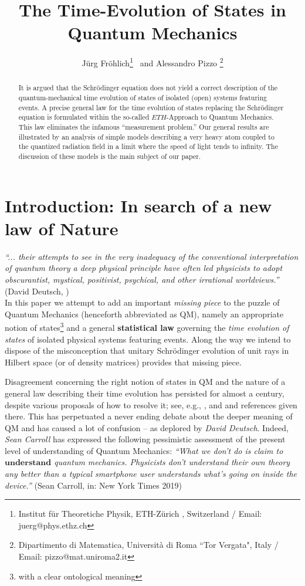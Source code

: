 \documentclass[a4paper,11pt]{article}
\author{J\"{u}rg Fr\"{o}hlich\footnote{Institut f\"ur Theoretiche Physik, ETH-Z\"urich , Switzerland / Email: juerg@phys.ethz.ch}\,\,\, and Alessandro Pizzo \footnote{Dipartimento di Matematica, Universit\`a di Roma ``Tor Vergata", Italy
/ Email: pizzo@mat.uniroma2.it}}
\title{The Time-Evolution of States in Quantum Mechanics}
\begin{document}
\maketitle


\begin{abstract}
It is argued that the Schr\"odinger equation does not yield a correct description of the quantum-mechanical time evolution of states of isolated (open) systems featuring events. A precise general law for the time evolution of states replacing the Schr\"odinger equation is formulated within the so-called $ETH$-Approach to Quantum Mechanics. This law eliminates the infamous ``measurement problem.'' Our general results are illustrated by an analysis of simple models describing a very heavy atom coupled to the quantized radiation field in a limit where the speed of light tends to infinity. The discussion of these models is the main subject of our paper.
\end{abstract}

\tableofcontents

\section{Introduction: In search of a new law of Nature}\label{Intro}

\hspace{0.5cm} \textit{``... their attempts to see in the very inadequacy of the conventional interpretation of quantum theory a 
deep physical principle have often led physicists to adopt obscurantist, mystical, positivist, psychical, and other irrational 
worldviews.''} (David Deutsch, \cite{Deutsch})\\

In this paper we attempt to add an important \textit{missing piece} to the puzzle of Quantum Mechanics (henceforth 
abbreviated as QM), namely an appropriate notion of states\footnote{with a clear ontological meaning} and a general {\bf{statistical law}} governing the \textit{time evolution of states} of isolated physical systems featuring events. Along the way we intend to dispose of the misconception 
that unitary Schr\"odinger evolution of unit rays in Hilbert space (or of density matrices) provides that missing piece.

Disagreement concerning the right notion of states in QM and the nature of a general law describing their time evolution 
has persisted for almost a century, despite various proposals of how to resolve it; see, e.g., \cite{Bohm, GRW, Everett}, 
and \cite{Bell, ABDZ} and references given there. This has perpetuated a never ending debate about the deeper meaning 
of QM and has caused a lot of confusion -- as deplored by \textit{David Deutsch}. 
Indeed, \textit{Sean Carroll} has expressed the following pessimistic assessment of the present level 
of understanding of Quantum Mechanics: \textit{``What we don't do is claim to $\mathbf{understand}$ 
quantum mechanics. Physicists don't understand their own theory any better than a typical smartphone 
user understands what's going on inside the device.''} (Sean Carroll, in: New York Times 2019)   
\end{document}

